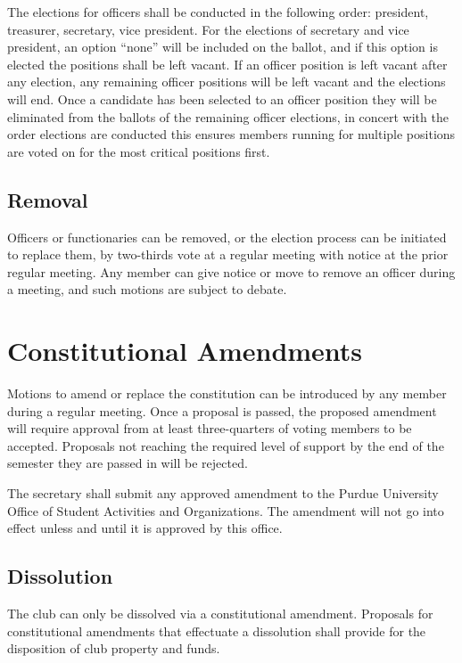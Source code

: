 \documentclass{article}
\begin{document}
The elections for officers shall be conducted in the following order: president,
treasurer, secretary, vice president. For the elections of secretary and vice
president, an option ``none'' will be included on the ballot, and if this option
is elected the positions shall be left vacant. If an officer position is left
vacant after any election, any remaining officer positions will be left vacant
and the elections will end. Once a candidate has been selected to an officer
position they will be eliminated from the ballots of the remaining officer
elections, in concert with the order elections are conducted this ensures
members running for multiple positions are voted on for the most critical
positions first.

\subsection{Removal}

Officers or functionaries can be removed, or the election process can be
initiated to replace them, by two-thirds vote at a regular meeting with notice
at the prior regular meeting. Any member can give notice or move to remove an
officer during a meeting, and such motions are subject to debate.

\section{Constitutional Amendments}

Motions to amend or replace the constitution can be introduced by any member
during a regular meeting. Once a proposal is passed, the proposed amendment will
require approval from at least three-quarters of voting members to be accepted.
Proposals not reaching the required level of support by the end of the semester
they are passed in will be rejected.

The secretary shall submit any approved amendment to the Purdue University
Office of Student Activities and Organizations. The amendment will not go into
effect unless and until it is approved by this office.

\subsection{Dissolution}

The club can only be dissolved via a constitutional amendment. Proposals for
constitutional amendments that effectuate a dissolution shall provide for the
disposition of club property and funds.
\end{document}

